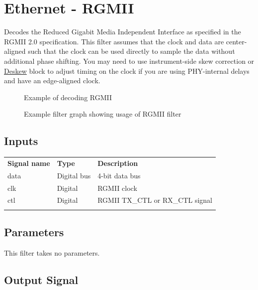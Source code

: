 \pagebreak
\section{Ethernet - RGMII}
\label{filter:rgmii}

Decodes the Reduced Gigabit Media Independent Interface as specified in the RGMII 2.0 specification. This filter
assumes that the clock and data are center-aligned such that the clock can be used directly to sample the data without
additional phase shifting. You may need to use instrument-side skew correction or \hyperref[filter:deskew]{Deskew}
block to adjust timing on the clock if you are using PHY-internal delays and have an edge-aligned clock.

\begin{figure}[h]
\centering
{}
\caption{Example of decoding RGMII}
\label{filter_rgmii}
\end{figure}

\begin{figure}[h]
\centering
{}
\caption{Example filter graph showing usage of RGMII filter}
\label{filter_rgmii}
\end{figure}

\FloatBarrier

\subsection{Inputs}

\begin{tabularx}{16cm}{llX}
\thickhline
\textbf{Signal name} & \textbf{Type} & \textbf{Description} \\
\thickhline
data & Digital bus & 4-bit data bus\\
\thinhline
clk & Digital & RGMII clock \\
\thinhline
ctl & Digital & RGMII TX\_CTL or RX\_CTL signal \\
\thickhline
\end{tabularx}

\subsection{Parameters}

This filter takes no parameters.

\subsection{Output Signal}

